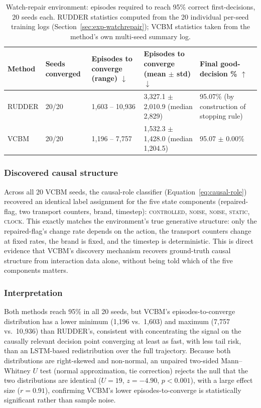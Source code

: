 \begin{table}[H]
  \centering
  \caption{Watch-repair environment: episodes required to reach 95\% correct first-decisions, 20 seeds each. RUDDER statistics computed from the 20 individual per-seed training logs (Section~\ref{sec:exp-watchrepair}); VCBM statistics taken from the method's own multi-seed summary log.}
  \label{tab:watchrepair-results}
  \begin{tabularx}{\linewidth}{@{}l Z Z Z Z@{}}
    \toprule
    \textbf{Method} & \textbf{Seeds converged} & \textbf{Episodes to converge (range) $\downarrow$} & \textbf{Episodes to converge (mean $\pm$ std) $\downarrow$} & \textbf{Final good-decision \% $\uparrow$} \\
    \midrule
    RUDDER          & 20/20                    & 1{,}603 -- 10{,}936                                & 3{,}327.1 $\pm$ 2{,}010.9 (median 2{,}829)                  & 95.07\% (by construction of stopping rule) \\
    VCBM            & 20/20                    & 1{,}196 -- 7{,}757                                 & 1{,}532.3 $\pm$ 1{,}428.0 (median 1{,}204.5)                & 95.07 $\pm$ 0.00\%                         \\
    \bottomrule
  \end{tabularx}
\end{table}

\subsubsection{Discovered causal structure}
Across all 20 VCBM seeds, the causal-role classifier (Equation~\ref{eq:causal-role}) recovered an identical label assignment for the five state components (repaired-flag, two transport counters, brand, timestep): \textsc{controlled}, \textsc{noise}, \textsc{noise}, \textsc{static}, \textsc{clock}. This exactly matches the environment's true generative structure: only the repaired-flag's change rate depends on the action, the transport counters change at fixed rates, the brand is fixed, and the timestep is deterministic. This is direct evidence that VCBM's discovery mechanism recovers ground-truth causal structure from interaction data alone, without being told which of the five components matters.

\subsubsection{Interpretation}
Both methods reach 95\% in all 20 seeds, but VCBM's episodes-to-converge distribution has a lower minimum (1{,}196 vs.\ 1{,}603) and maximum (7{,}757 vs.\ 10{,}936) than RUDDER's, consistent with concentrating the signal on the causally relevant decision point converging at least as fast, with less tail risk, than an LSTM-based redistribution over the full trajectory. Because both distributions are right-skewed and non-normal, an unpaired two-sided Mann--Whitney $U$ test (normal approximation, tie correction) rejects the null that the two distributions are identical ($U=19$, $z=-4.90$, $p<0.001$), with a large effect size ($r=0.91$), confirming VCBM's lower episodes-to-converge is statistically significant rather than sample noise.

